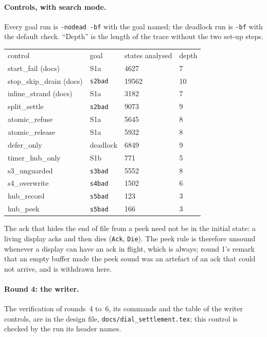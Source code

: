 \documentclass[a4paper,10pt,fleqn]{article}
\begin{document}
\paragraph{Controls, with search mode.}
Every goal run is \texttt{-nodead -bf} with the goal named; the deadlock run is
\texttt{-bf} with the default check.  ``Depth'' is the length of the trace
without the two set-up steps.
\begin{center}
\begin{tabular}{llll}
control & goal & states analysed & depth \\
start\_fail (docs) & S1a & 4627 & 7 \\
stop\_skip\_drain (docs) & \texttt{s2bad} & 19562 & 10 \\
inline\_strand (docs) & S1a & 3182 & 7 \\
split\_settle & \texttt{s2bad} & 9073 & 9 \\
atomic\_refuse & S1a & 5645 & 8 \\
atomic\_release & S1a & 5932 & 8 \\
defer\_only & deadlock & 6849 & 9 \\
timer\_hub\_only & S1b & 771 & 5 \\
s3\_unguarded & \texttt{s3bad} & 5552 & 8 \\
s4\_overwrite & \texttt{s4bad} & 1502 & 6 \\
hub\_record & \texttt{s5bad} & 123 & 3 \\
hub\_peek & \texttt{s5bad} & 166 & 3 \\
\end{tabular}
\end{center}
The ack that hides the end of file from a peek need not be in the initial
state: a living display acks and then dies (\texttt{Ack}, \texttt{Die}).  The
peek rule is therefore unsound whenever a display can have an ack in flight,
which is always; round 1's remark that an empty buffer made the peek sound was an
artefact of an ack that could not arrive, and is withdrawn here.

\paragraph{Round 4: the writer.}
The verification of rounds~4 to~6, its commands and the table of the
writer controls, are in the design file, \texttt{docs/dial\_settlement.tex};
this control is checked by the run its header names.
\end{document}
